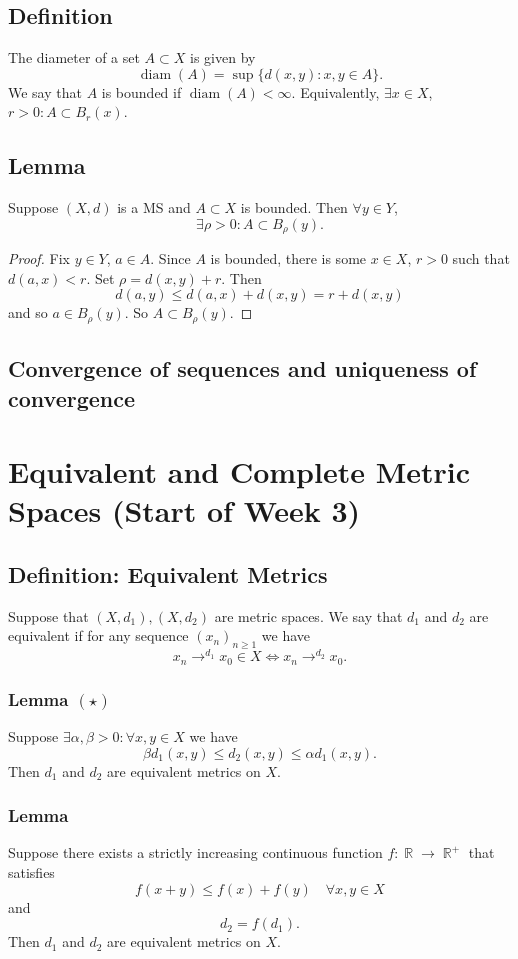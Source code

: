\documentclass{article}
\DeclareMathOperator\R{\mathbb{R}}
\DeclareMathOperator\diam{diam}
\begin{document}
\subsection*{Definition}
The diameter of a set $A \subset X$ is given by
$$
\diam(A) = \sup \{ d(x,y):x,y \in A \}.
$$
We say that $A$ is bounded if $\diam(A) < \infty$. Equivalently, $\exists x \in X$, $r>0: A \subset B_r(x)$.
\subsection*{Lemma}
Suppose $(X,d)$ is a MS and $A \subset X$ is bounded. Then $\forall y \in Y$, $$
\exists \rho > 0: A \subset B_{\rho}(y).
$$
\begin{proof}
Fix $y \in Y$, $a \in A$. Since $A$ is bounded,
there is some $x \in X$, $r>0$
such that $d(a,x) < r$. Set $\rho = d(x,y) + r$. Then $$
d(a,y) \leq d(a,x) + d(x,y) = r + d(x,y)
$$
and so $a \in B_{\rho}(y)$. So $A \subset B_{\rho}(y)$.
\end{proof}
\subsection*{Convergence of sequences and uniqueness of convergence}
\section*{Equivalent and Complete Metric Spaces (Start of Week 3)}
\subsection*{Definition: Equivalent Metrics}
Suppose that $(X,d_1),(X,d_2)$ are metric spaces.
We say that $d_1$ and $d_2$ are
equivalent if for any sequence $(x_n)_{n \geq 1}$ we have $$
x_n \to^{d_1} x_0 \in X \iff x_n \to^{d_2} x_0.
$$
\subsubsection*{Lemma $(\star)$}
Suppose $\exists \alpha,\beta > 0: \forall x,y \in X$ we have $$
\beta d_1(x,y) \leq d_2(x,y) \leq \alpha d_1(x,y).
$$
Then $d_1$ and $d_2$ are equivalent metrics on $X$.
\subsubsection*{Lemma}
Suppose there exists a strictly increasing continuous function
$f: \R \to \R^{+}$
that satisfies
$$
f(x+y) \leq f(x) + f(y) \quad \forall x,y \in X
$$
and $$
d_2 = f(d_1).
$$
Then $d_1$ and $d_2$ are equivalent metrics on $X$.
\end{document}
